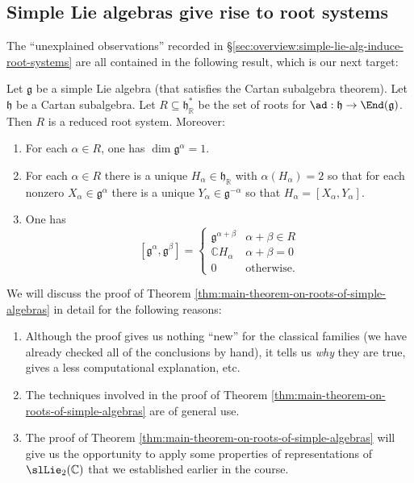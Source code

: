 \documentclass[reqno]{amsart} 
\begin{document}
\subsection{Simple Lie algebras give rise to root systems\label{sec:simple-lie-alg-give-roots}}
\label{sec:orgfacc967}
The ``unexplained observations'' recorded in \S\ref{sec:overview:simple-lie-alg-induce-root-systems} are all contained in the following result, which is our next target:
\begin{theorem}\label{thm:main-theorem-on-roots-of-simple-algebras}
  Let $\mathfrak{g}$ be a simple Lie algebra (that satisfies the Cartan subalgebra theorem).  Let $\mathfrak{h}$ be a Cartan subalgebra.  Let $R \subseteq \mathfrak{h}_\mathbb{R}^*$ be the set of roots for $\ad : \mathfrak{h} \rightarrow \End(\mathfrak{g})$.  Then $R$ is a reduced root system.  Moreover:
  \begin{enumerate}
  \item For each $\alpha \in R$, one has $\dim \mathfrak{g}^\alpha = 1$.
  \item For each $\alpha \in R$ there is a unique $H_\alpha \in \mathfrak{h}_\mathbb{R}$ with $\alpha(H_\alpha) = 2$ so that for each nonzero $X_\alpha \in \mathfrak{g}^\alpha$ there is a unique $Y_\alpha \in \mathfrak{g}^{-\alpha}$ so that $H_\alpha = [X_\alpha,Y_\alpha]$.
  \item One has
    \begin{equation*}
      {} [\mathfrak{g}^\alpha, \mathfrak{g}^\beta]
      = 
\begin{cases}
        \mathfrak{g}^{\alpha+\beta} & \alpha + \beta \in R \\
        \mathbb{C} H_\alpha  & \alpha + \beta = 0 \\
        0 & \text{otherwise.}
      \end{cases}
    \end{equation*}
  \end{enumerate}
\end{theorem}

\begin{remark}
  We will discuss the proof of Theorem \ref{thm:main-theorem-on-roots-of-simple-algebras} in detail for the following reasons:
  \begin{enumerate}
  \item Although the proof gives us nothing ``new'' for the classical families (we have already checked all of the conclusions by hand), it tells us \emph{why} they are true, gives a less computational explanation, etc.
  \item The techniques involved in the proof of Theorem \ref{thm:main-theorem-on-roots-of-simple-algebras} are of general use.
  \item The proof of Theorem \ref{thm:main-theorem-on-roots-of-simple-algebras} will give us the opportunity to apply some properties of representations of $\slLie_2(\mathbb{C})$ that we established earlier in the course.
  \end{enumerate}
\end{remark}
\end{document}
